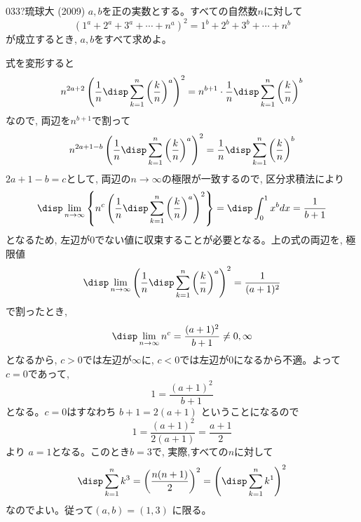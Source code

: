 \begin{thm}{033}{\hosi ?}{琉球大 (2009)}
 $a,b$を正の実数とする。すべての自然数$n$に対して
\[(1^a+2^a+3^a+\cdots +n^a)^2=1^b+2^b+3^b+\cdots +n^b\]
が成立するとき, $a,b$をすべて求めよ。
\end{thm}

式を変形すると
\[n^{2a+2}\left(\dfrac{1}{n}\disp\sum_{k=1}^{n}\left(\dfrac{k}{n}\right)^a\right)^2=n^{b+1}\cdot\dfrac{1}{n}\disp\sum_{k=1}^n\left(\dfrac{k}{n}\right)^b\]
なので, 両辺を$n^{b+1}$で割って
\[ n^{2a+1-b}\left(\dfrac{1}{n}\disp\sum_{k=1}^{n}\left(\dfrac{k}{n}\right)^a\right)^2=\dfrac{1}{n}\disp\sum_{k=1}^n\left(\dfrac{k}{n}\right)^b\]
$2a+1-b=c$として, 両辺の$n\to \infty$の極限が一致するので, 区分求積法により
\[\disp\lim_{n\to \infty} \left\{n^c\left(\dfrac{1}{n}\disp\sum_{k=1}^{n}\left(\dfrac{k}{n}\right)^a\right)^2\right\}=\disp\int_0^1 x^b dx = \dfrac{1}{b+1}\]
となるため, 左辺が0でない値に収束することが必要となる。上の式の両辺を, 極限値
\[\disp\lim_{n\to \infty} \left(\dfrac{1}{n}\disp\sum_{k=1}^n\left(\dfrac{k}{n}\right)^a\right)^{2} = \dfrac{1}{(a+1)^2}\]
で割ったとき,
\[\disp\lim_{n\to \infty} n^c = \dfrac{(a+1)^2}{b+1}\neq 0, \infty\]
となるから, $c>0$では左辺が$\infty$に, $c<0$では左辺が$0$になるから不適。よって$c=0$であって,
\[1=\dfrac{(a+1)^2}{b+1}\]
となる。$c=0$はすなわち $b+1=2(a+1)$ ということになるので
\[1=\dfrac{(a+1)^2}{2(a+1)}=\dfrac{a+1}{2}\]
より $a=1$となる。このとき$b=3$で, 実際,すべての$n$に対して
\[\disp\sum_{k=1}^n k^3=\left(\dfrac{n(n+1)}{2}\right)^2=\left(\disp\sum_{k=1}^n k^1\right)^2\]
なのでよい。従って$(a,b)=(1,3)$ に限る。